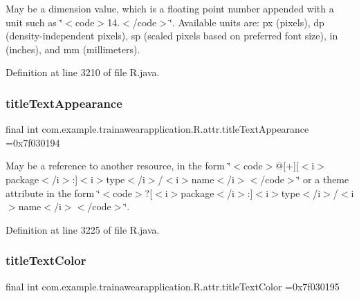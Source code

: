 May be a dimension value, which is a floating point number appended with a unit such as \char`\"{}$<$code$>$14.\+5sp$<$/code$>$\char`\"{}. Available units are\+: px (pixels), dp (density-\/independent pixels), sp (scaled pixels based on preferred font size), in (inches), and mm (millimeters). 

Definition at line 3210 of file R.\+java.

\mbox{\label{classcom_1_1example_1_1trainawearapplication_1_1_r_1_1attr_ac78eb1665e04a23d707b7a743835a6e6}} 
\subsubsection{\texorpdfstring{titleTextAppearance}{titleTextAppearance}}
{\footnotesize\ttfamily final int com.\+example.\+trainawearapplication.\+R.\+attr.\+title\+Text\+Appearance =0x7f030194\hspace{0.3cm}{\ttfamily [static]}}

May be a reference to another resource, in the form \char`\"{}$<$code$>$@\mbox{[}+\mbox{]}\mbox{[}$<$i$>$package$<$/i$>$\+:\mbox{]}$<$i$>$type$<$/i$>$/$<$i$>$name$<$/i$>$$<$/code$>$\char`\"{} or a theme attribute in the form \char`\"{}$<$code$>$?\mbox{[}$<$i$>$package$<$/i$>$\+:\mbox{]}$<$i$>$type$<$/i$>$/$<$i$>$name$<$/i$>$$<$/code$>$\char`\"{}. 

Definition at line 3225 of file R.\+java.

\mbox{\label{classcom_1_1example_1_1trainawearapplication_1_1_r_1_1attr_ab48157b601f87e32ca393ae840611a74}} 
\subsubsection{\texorpdfstring{titleTextColor}{titleTextColor}}
{\footnotesize\ttfamily final int com.\+example.\+trainawearapplication.\+R.\+attr.\+title\+Text\+Color =0x7f030195\hspace{0.3cm}{\ttfamily [static]}}

